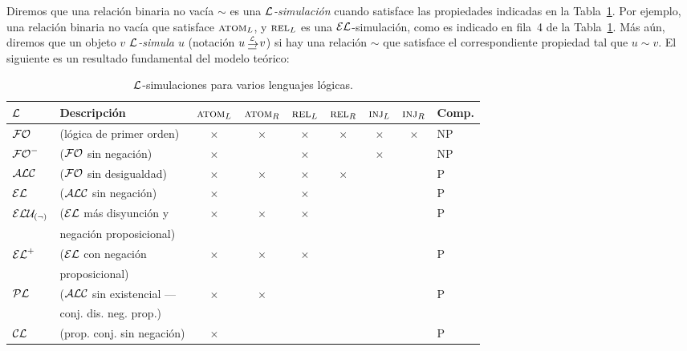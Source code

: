 Diremos que una relaci\'on binaria no vac\'ia $\sim$ es una 
\emph{$\mathcal{L}$-simulaci\'on} cuando satisface las propiedades indicadas
en la Tabla~\ref{tab:simuls}. Por ejemplo, una relaci\'on binaria no vac\'ia que satisface $\textsc{atom}_L$, y $\textsc{rel}_L$ es una $\mathcal{EL}$-simulaci\'on, como es indicado en fila~4 de la Tabla~\ref{tab:simuls}. M\'as a\'un, diremos que un objeto
\emph{$v$ $\mathcal{L}$-simula $u$} (notaci\'on $u \simul{\+L} v$) si hay una relaci\'on $\sim$ que satisface el correspondiente propiedad tal que
$u \sim v$. El siguiente es un resultado fundamental del modelo te\'orico:%

\begin{table}[t]

\begin{tabular}{|l|l|cccccc|l|}
\hline
  $\mathcal{L}$ & Descripci\'on &$\textsc{atom}_L$ & $\textsc{atom}_R$ & $\textsc{rel}_L$ & $\textsc{rel}_R$ & $\textsc{inj}_L\space$ & $\textsc{inj}_R\space$ & Comp.\\
  \hline
  $\mathcal{FO}$ & (l\'ogica de primer orden)  & $\times$ & $\times$ & $\times$ & $\times$ & $\times$ & $\times$ & NP\\ \hline
  ${\mathcal{FO}^-}$ & ($\mathcal{FO}$ sin negaci\'on) & $\times$ & & $\times$ && $\times$ & & NP\\ \hline 
  $\mathcal{ALC}$   & ($\mathcal{FO}$ sin desigualdad) & $\times$ & $\times$ & $\times$ & $\times$&& & P\\ \hline
  $\mathcal{EL}$   & ($\mathcal{ALC}$ sin negaci\'on) & $\times$ & &  $\times$ & & & &P\\ \hline
	$\mathcal{ELU_{(\neg)} }$ & ($\mathcal{EL}$ m\'as disyunci\'on y  & $\times$ & $\times$ &  $\times$ & & & &P\\ 
	&negaci\'on proposicional)&&&&&&&\\ \hline
  ${\mathcal{EL}^+}$ & ($\mathcal{EL}$ con negaci\'on & $\times$ & $\times$ &  $\times$ & & & &P\\ 
	&proposicional) &&&&&&& \\ \hline
	$\mathcal{PL}$ & ($\mathcal{ALC}$ sin existencial --- & $\times$ & $\times$ & & & & &P\\ 
	&conj. dis. neg. prop.)&&&&&&&\\ \hline
	$\mathcal{CL}$ & (prop. conj. sin negaci\'on)& $\times$ &  &  & & & &P\\ 
	
\hline	
\end{tabular}

\caption{$\mathcal{L}$-simulaciones para varios lenguajes l\'ogicas.}\label{tab:simuls}
\end{table}




